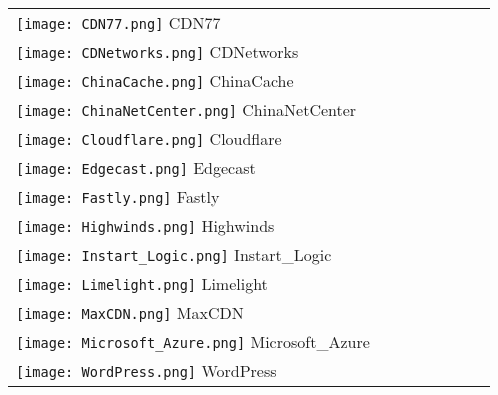 \begin{table}[]
\begin{tabular}{|llll|llll|}
\texttt{[image: CDN77.png]} CDN77 \\
\texttt{[image: CDNetworks.png]} CDNetworks \\
\texttt{[image: ChinaCache.png]} ChinaCache \\
\texttt{[image: ChinaNetCenter.png]} ChinaNetCenter \\
\texttt{[image: Cloudflare.png]} Cloudflare \\
\texttt{[image: Edgecast.png]} Edgecast \\
\texttt{[image: Fastly.png]} Fastly \\
\texttt{[image: Highwinds.png]} Highwinds \\
\texttt{[image: Instart\_Logic.png]} Instart_Logic \\
\texttt{[image: Limelight.png]} Limelight \\
\texttt{[image: MaxCDN.png]} MaxCDN \\
\texttt{[image: Microsoft\_Azure.png]} Microsoft_Azure \\
\texttt{[image: WordPress.png]} WordPress \\
\hline
\end{tabular}
\end{table}
